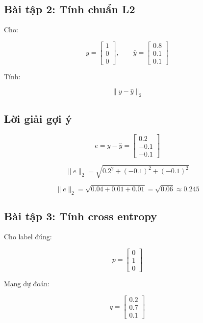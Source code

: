 \subsection*{Bài tập 2: Tính chuẩn L2}

Cho:

\[
    y =
    \begin{bmatrix}
    1\\0\\0
    \end{bmatrix},
    \qquad
    \hat{y} =
    \begin{bmatrix}
    0.8\\0.1\\0.1
    \end{bmatrix}
\]

Tính:

\[
    \|y-\hat{y}\|_2
\]

\subsection*{Lời giải gợi ý}

\[
    e=y-\hat{y}
    =
    \begin{bmatrix}
    0.2\\-0.1\\-0.1
    \end{bmatrix}
\]

\[
    \|e\|_2
    =
    \sqrt{0.2^2+(-0.1)^2+(-0.1)^2}
\]

\[
    \|e\|_2
    =
    \sqrt{0.04+0.01+0.01}
    =
    \sqrt{0.06}
    \approx 0.245
\]

\subsection*{Bài tập 3: Tính cross entropy}

Cho label đúng:

\[
    p =
    \begin{bmatrix}
    0\\1\\0
    \end{bmatrix}
\]

Mạng dự đoán:

\[
    q =
    \begin{bmatrix}
    0.2\\0.7\\0.1
    \end{bmatrix}
\]


